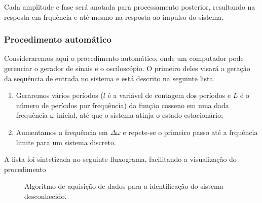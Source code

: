\documentclass[x11names,a4paper,12pt]{article}
\begin{document}
Cada amplitude e fase será anotada para processamento posterior, resultando na resposta em frquência e até mesmo na resposta ao impulso do sistema.

\subsubsection{Procedimento automático}\label{sssec:automated_procedure}

Consideraremos aqui o procedimento automático, onde um computador pode gerenciar o gerador de sinais e o osciloscópio. O primeiro deles visará a geração da sequência de entrada no sistema e está descrito na seguinte lista

\begin{enumerate}
  \item Geraremos vários períodos ($l$ é a variável de contagem dos períodos e $L$ é o número de períodos por frequência) da função cosseno em uma dada frequência $\omega$ inicial, até que o sistema atinja o estado estacionário;
  \item Aumentamos a frequência em $\Delta\omega$ e repete-se o primeiro passo até a frquência limite para um sistema discreto.
\end{enumerate}

A lista foi sintetizada no seguinte fluxograma, facilitando a visualização do procedimento

\begin{figure}[H]
  \centering
  \caption{Algoritmo de aquisição de dados para a identificação do sistema desconhecido.}
  \label{fig:data_algo}
\end{figure}
\end{document}
